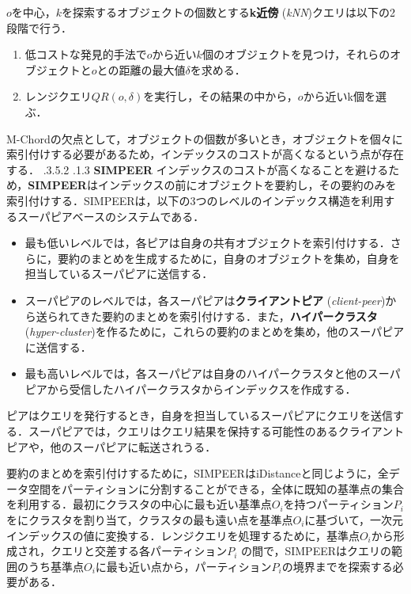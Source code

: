 \documentclass{jarticle}
\makeatletter
\renewcommand{\subsubsection}{\@startsection{subsubsection}{3}{\z@}%
   {.3\Cvs \@plus.5\Cvs \@minus.2\Cvs}%
   {.1\Cvs \@plus.3\Cvs}%
   {\reset@font\normalsize\bfseries}}
\makeatother
\begin{document}
{$o$を中心，$k$を探索するオブジェクトの個数とする\textbf{k近傍} (\textit{kNN})クエリは以下の2段階で行う．
\begin{enumerate}
 \item 低コストな発見的手法で$o$から近い$k$個のオブジェクトを見つけ，それらのオブジェクトと$o$との距離の最大値$\delta$を求める．
 \item レンジクエリ$QR(o,\delta)$を実行し，その結果の中から，$o$から近いk個を選ぶ．
\end{enumerate}

M-Chordの欠点として，オブジェクトの個数が多いとき，オブジェクトを個々に索引付けする必要があるため，インデックスのコストが高くなるという点が存在する．
\subsubsection{\textbf{SIMPEER}}
インデックスのコストが高くなることを避けるため，\textbf{SIMPEER}はインデックスの前にオブジェクトを要約し，その要約のみを
索引付けする．SIMPEERは，以下の3つのレベルのインデックス構造を利用するスーパピアベースのシステムである．
\begin{itemize}
  \item 最も低いレベルでは，各ピアは自身の共有オブジェクトを索引付けする．さらに，要約のまとめを生成するために，自身のオブジェクトを集め，自身を担当しているスーパピアに送信する．
  \item スーパピアのレベルでは，各スーパピアは\textbf{クライアントピア} (\textit{client-peer})から送られてきた要約のまとめを索引付けする．また，\textbf{ハイパークラスタ} (\textit{hyper-cluster})を作るために，これらの要約のまとめを集め，他のスーパピアに送信する．
  \item 最も高いレベルでは，各スーパピアは自身のハイパークラスタと他のスーパピアから受信したハイパークラスタからインデックスを作成する．
\end{itemize}

ピアはクエリを発行するとき，自身を担当しているスーパピアにクエリを送信する．スーパピアでは，クエリはクエリ結果を保持する可能性のあるクライアントピアや，他のスーパピアに転送されうる．

要約のまとめを索引付けするために，SIMPEERはiDistanceと同じように，全データ空間をパーティションに分割することができる，全体に既知の基準点の集合を利用する．最初にクラスタの中心に最も近い基準点$O_i$を持つパーティション$P_i$をにクラスタを割り当て，クラスタの最も遠い点を基準点$O_i$に基づいて，一次元インデックスの値に変換する．レンジクエリを処理するために，基準点$O_i$から形成され，クエリと交差する各パーティション$P_i$ の間で，SIMPEERはクエリの範囲のうち基準点$O_i$に最も近い点から，パーティション$P_i$の境界までを探索する必要がある．

}
\end{document}
